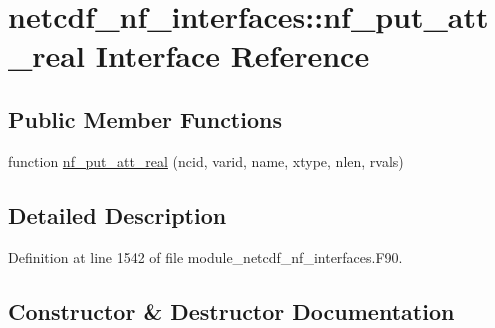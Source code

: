 \hypertarget{interfacenetcdf__nf__interfaces_1_1nf__put__att__real}{}\section{netcdf\+\_\+nf\+\_\+interfaces\+:\+:nf\+\_\+put\+\_\+att\+\_\+real Interface Reference}
\label{interfacenetcdf__nf__interfaces_1_1nf__put__att__real}
\subsection*{Public Member Functions}
\begin{DoxyCompactItemize}
\item 
function \hyperlink{interfacenetcdf__nf__interfaces_1_1nf__put__att__real_aa03320b696ca7254378c4c56cbab3f28}{nf\+\_\+put\+\_\+att\+\_\+real} (ncid, varid, name, xtype, nlen, rvals)
\end{DoxyCompactItemize}


\subsection{Detailed Description}


Definition at line 1542 of file module\+\_\+netcdf\+\_\+nf\+\_\+interfaces.\+F90.



\subsection{Constructor \& Destructor Documentation}
\mbox{\label{interfacenetcdf__nf__interfaces_1_1nf__put__att__real_aa03320b696ca7254378c4c56cbab3f28}} 
